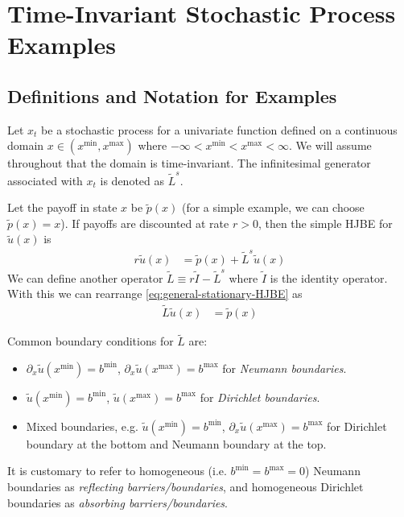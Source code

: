 \documentclass[11pt]{article}
\newcommand{\D}[1][]{\ensuremath{\partial_{#1}}}
\begin{document}
\section{Time-Invariant Stochastic Process Examples}\label{sec:examples}
\subsection{Definitions and Notation for Examples}
Let $x_t$ be a stochastic process for a univariate function defined on a continuous domain $x \in (x^{\min}, x^{\max})$ where $-\infty < x^{\min} < x^{\max} < \infty$.  We will assume throughout that the domain is time-invariant. The infinitesimal generator associated with $x_t$ is denoted as $\tilde{L}^s$.

Let the payoff in state $x$ be $\tilde{p}(x)$ (for a simple example, we can choose $\tilde{p}(x) = x$). If payoffs are discounted at rate $r > 0$, then the simple HJBE for $\tilde{u}(x)$ is
\begin{align}
	r \tilde{u}(x) &= \tilde{p}(x) + \tilde{L}^s \tilde{u}(x)\label{eq:general-stationary-HJBE}
\end{align}
We can define another operator $\tilde{L} \equiv r\tilde{I} - \tilde{L}^s$ where $\tilde{I}$ is the identity operator. With this we can rearrange \cref{eq:general-stationary-HJBE} as
\begin{align}
	\tilde{L} \tilde{u}(x) &= \tilde{p}(x)
\end{align}

Common boundary conditions for $\tilde{L}$ are:
\begin{itemize}
	\item $\D[x]\tilde{u}(x^{\min}) = b^{\min}$, $\D[x]\tilde{u}(x^{\max}) = b^{\max}$ for \textit{Neumann boundaries}.
	\item $\tilde{u}(x^{\min}) = b^{\min}$, $\tilde{u}(x^{\max}) = b^{\max}$ for \textit{Dirichlet boundaries}.
	\item Mixed boundaries, e.g. $\tilde{u}(x^{\min}) = b^{\min}$, $\D[x]\tilde{u}(x^{\max}) = b^{\max}$ for Dirichlet boundary at the bottom and Neumann boundary at the top.
\end{itemize}
It is customary to refer to homogeneous (i.e. $b^{\min} = b^{\max} = 0$) Neumann boundaries as \textit{reflecting barriers/boundaries}, and homogeneous Dirichlet boundaries as \textit{absorbing barriers/boundaries}.
\end{document}
